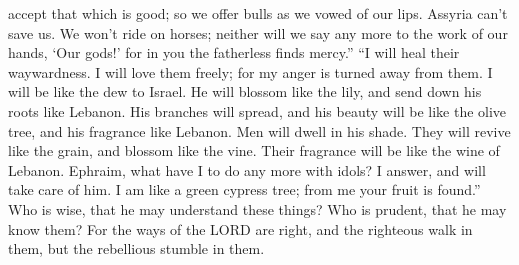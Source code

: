 accept that which is good; so we offer bulls as we vowed of our lips.
 Assyria can't save us. We won't ride on horses; neither
will we say any more to the work of our hands, `Our gods!' for in you
the fatherless finds mercy.''  ``I will heal their
waywardness. I will love them freely; for my anger is turned away from
them.  I will be like the dew to Israel. He will blossom
like the lily, and send down his roots like Lebanon.  His
branches will spread, and his beauty will be like the olive tree, and
his fragrance like Lebanon.  Men will dwell in his shade.
They will revive like the grain, and blossom like the vine. Their
fragrance will be like the wine of Lebanon.  Ephraim, what
have I to do any more with idols? I answer, and will take care of him. I
am like a green cypress tree; from me your fruit is found.''
 Who is wise, that he may understand these things? Who is
prudent, that he may know them? For the ways of the LORD are right, and
the righteous walk in them, but the rebellious stumble in them.
